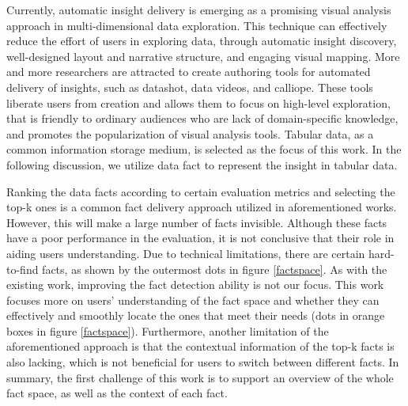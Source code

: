 \maketitle
Currently, automatic insight delivery is emerging as a promising visual analysis approach in multi-dimensional data exploration. 
This technique can effectively reduce the effort of users in exploring data, through automatic insight discovery, well-designed layout and narrative structure, and engaging visual mapping. 
More and more researchers are attracted to create authoring tools for automated delivery of insights, such as datashot, data videos, and calliope. 
These tools liberate users from creation and allows them to focus on high-level exploration, that is friendly to ordinary audiences who are lack of domain-specific knowledge, and promotes the popularization of visual analysis tools.
Tabular data, as a common information storage medium, is selected as the focus of this work. In the following discussion, we utilize data fact to represent the insight in tabular data.

Ranking the data facts according to certain evaluation metrics and selecting the top-k ones is a common fact delivery approach utilized in aforementioned works. 
However, this will make a large number of facts invisible. Although these facts have a poor performance in the evaluation, it is not conclusive that their role in aiding users understanding.
Due to technical limitations, there are certain hard-to-find facts, as shown by the outermost dots in figure \ref{factspace}. 
As with the existing work, improving the fact detection ability is not our focus. This work focuses more on users' understanding of the fact space and whether they can effectively and smoothly locate the ones that meet their needs (dots in orange boxes in figure \ref{factspace}).
Furthermore, another limitation of the aforementioned approach is that the contextual information of the top-k facts is also lacking, which is not beneficial for users to switch between different facts.
In summary, the first challenge of this work is to support an overview of the whole fact space, as well as the context of each fact.


